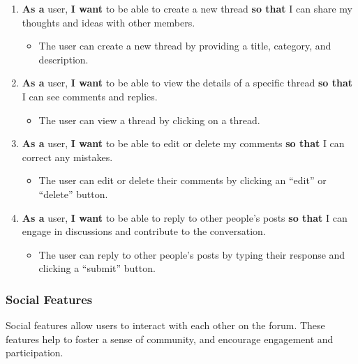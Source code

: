 \documentclass[10pt]{exam}
\providecommand{\tightlist}{%
  \setlength{\itemsep}{0pt}\setlength{\parskip}{0pt}}
\begin{document}
\begin{enumerate}
\def\labelenumi{\arabic{enumi}.}
\item
  \textbf{As a} user, \textbf{I want} to be able to create a new thread
  \textbf{so that} I can share my thoughts and ideas with other members.

  \begin{itemize}
  \tightlist
  \item
    The user can create a new thread by providing a title, category, and
    description.
  \end{itemize}
\item
  \textbf{As a} user, \textbf{I want} to be able to view the details of
  a specific thread \textbf{so that} I can see comments and replies.

  \begin{itemize}
  \tightlist
  \item
    The user can view a thread by clicking on a thread.
  \end{itemize}
\item
  \textbf{As a} user, \textbf{I want} to be able to edit or delete my
  comments \textbf{so that} I can correct any mistakes.

  \begin{itemize}
  \tightlist
  \item
    The user can edit or delete their comments by clicking an ``edit''
    or ``delete'' button.
  \end{itemize}
\item
  \textbf{As a} user, \textbf{I want} to be able to reply to other
  people's posts \textbf{so that} I can engage in discussions and
  contribute to the conversation.

  \begin{itemize}
  \tightlist
  \item
    The user can reply to other people's posts by typing their response
    and clicking a ``submit'' button.
  \end{itemize}
\end{enumerate}

\hypertarget{social-features}{%
\subsubsection{Social Features}\label{social-features}}

Social features allow users to interact with each other on the forum.
These features help to foster a sense of community, and encourage
engagement and participation.
\end{document}
